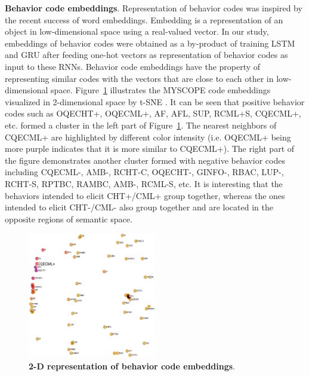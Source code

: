 \documentclass{amia_summit_2018}
\begin{document}
\textbf {Behavior code embeddings}. Representation of behavior codes was inspired by the recent success of word embeddings\cite{bengio2003neural}. Embedding is a representation of an object in low-dimensional space using a real-valued vector. In our study, embeddings of behavior codes were obtained as a by-product of training LSTM and GRU after feeding one-hot vectors as representation of behavior codes as input to these RNNs. Behavior code embeddings have the property of representing similar codes with the vectors that are close to each other in low-dimensional space. Figure~\ref{fig:code_embedding} illustrates the MYSCOPE code embeddings visualized in 2-dimensional space by t-SNE \cite{maaten2008visualizing}. It can be seen that positive behavior codes such as OQECHT+, OQECML+, AF, AFL, SUP, RCML+S, CQECML+, etc. formed a cluster in the left part of Figure~\ref{fig:code_embedding}. The nearest neighbors of CQECML+ are highlighted by different color intensity (i.e. OQECML+ being more purple indicates that it is more similar to CQECML+). The right part of the figure demonstrates another cluster formed with negative behavior codes including CQECML-, AMB-, RCHT-C, OQECHT-, GINFO-, RBAC, LUP-, RCHT-S, RPTBC, RAMBC, AMB-, RCML-S, etc. It is interesting that the behaviors intended to elicit CHT+/CML+ group together, whereas the ones intended to elicit CHT-/CML- also group together and are located in the opposite regions of semantic space. 
    
\begin{figure}[!htb]
    \centering
    \includegraphics[width=0.50\textwidth]{figures/code_embed.eps}
    \caption{\textbf{2-D representation of behavior code embeddings}.}
    \label{fig:code_embedding}
\end{figure}
\end{document}
